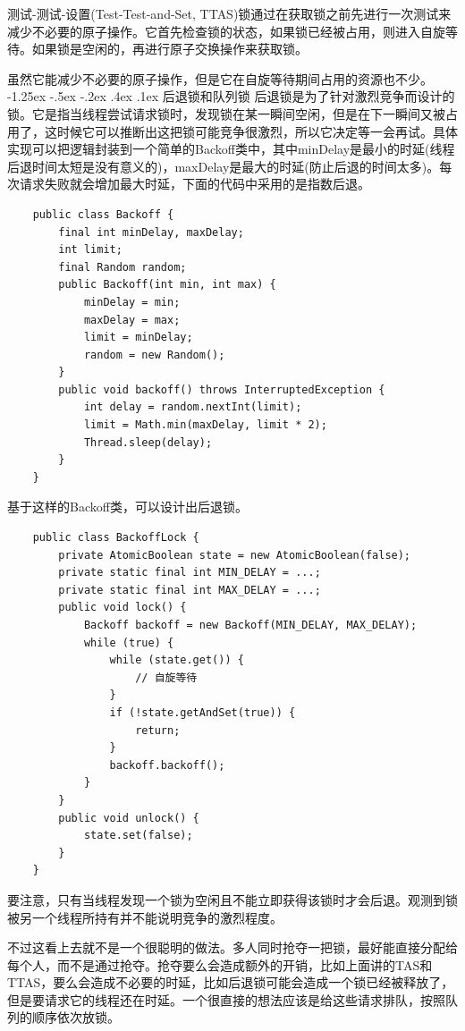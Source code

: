 \documentclass[a4paper, 11pt]{ctexart}
\makeatletter
\newcommand{\xiaosihao}{\fontsize{12pt}{\baselineskip}\selectfont}
\renewcommand\subsection{\@startsection{subsection}{1}{\z@}%
{-1.25ex \@plus -.5ex \@minus -.2ex}%
{.4ex \@plus .1ex}%
{\normalfont\xiaosihao\CJKfamily{hei}}}
\makeatother
\begin{document}
测试-测试-设置(Test-Test-and-Set, TTAS)锁通过在获取锁之前先进行一次测试来减少不必要的原子操作。它首先检查锁的状态，如果锁已经被占用，则进入自旋等待。如果锁是空闲的，再进行原子交换操作来获取锁。

虽然它能减少不必要的原子操作，但是它在自旋等待期间占用的资源也不少。
\subsection{后退锁和队列锁}
后退锁是为了针对激烈竞争而设计的锁。它是指当线程尝试请求锁时，发现锁在某一瞬间空闲，但是在下一瞬间又被占用了，这时候它可以推断出这把锁可能竞争很激烈，所以它决定等一会再试。具体实现可以把逻辑封装到一个简单的Backoff类中，其中minDelay是最小的时延(线程后退时间太短是没有意义的)，maxDelay是最大的时延(防止后退的时间太多)。每次请求失败就会增加最大时延，下面的代码中采用的是指数后退。
\begin{lstlisting}
    public class Backoff {
        final int minDelay, maxDelay;
        int limit;
        final Random random;
        public Backoff(int min, int max) {
            minDelay = min;
            maxDelay = max;
            limit = minDelay;
            random = new Random();
        }
        public void backoff() throws InterruptedException {
            int delay = random.nextInt(limit);
            limit = Math.min(maxDelay, limit * 2);
            Thread.sleep(delay);
        }
    }
\end{lstlisting} 

基于这样的Backoff类，可以设计出后退锁。
\begin{lstlisting}
    public class BackoffLock {
        private AtomicBoolean state = new AtomicBoolean(false);
        private static final int MIN_DELAY = ...;
        private static final int MAX_DELAY = ...;
        public void lock() {
            Backoff backoff = new Backoff(MIN_DELAY, MAX_DELAY);
            while (true) {
                while (state.get()) {
                    // 自旋等待
                }
                if (!state.getAndSet(true)) {
                    return;
                }
                backoff.backoff();
            }
        }
        public void unlock() {
            state.set(false);
        }
    }
\end{lstlisting}

要注意，只有当线程发现一个锁为空闲且不能立即获得该锁时才会后退。观测到锁被另一个线程所持有并不能说明竞争的激烈程度。

不过这看上去就不是一个很聪明的做法。多人同时抢夺一把锁，最好能直接分配给每个人，而不是通过抢夺。抢夺要么会造成额外的开销，比如上面讲的TAS和TTAS，要么会造成不必要的时延，比如后退锁可能会造成一个锁已经被释放了，但是要请求它的线程还在时延。一个很直接的想法应该是给这些请求排队，按照队列的顺序依次放锁。
\end{document}
